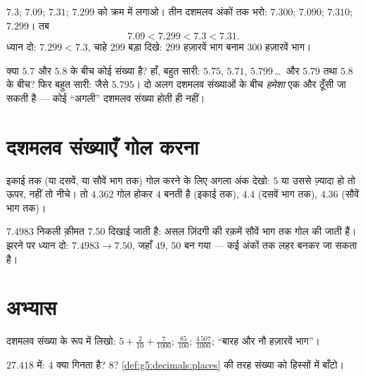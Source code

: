 \begin{example}\label{ex:g5:decimals:order}
$7.3$; $7.09$; $7.31$; $7.299$ को क्रम में लगाओ। तीन दशमलव अंकों
तक भरो: $7.300$; $7.090$; $7.310$; $7.299$। तब
\[
7.09 < 7.299 < 7.3 < 7.31 .
\]
ध्यान दो: $7.299 < 7.3$, चाहे $299$ बड़ा दिखे: $299$ हज़ारवें
भाग बनाम $300$ हज़ारवें भाग।
\end{example}

\begin{example}\label{ex:g5:decimals:between}
क्या $5.7$ और $5.8$ के बीच कोई संख्या है? हाँ, बहुत सारी:
$5.75$, $5.71$, $5.799$\,\dots\ और $5.79$ तथा $5.8$ के बीच? फिर
बहुत सारी: जैसे $5.795$। दो अलग दशमलव संख्याओं के बीच
\emph{हमेशा} एक और ठूँसी जा सकती है --- कोई ``अगली'' दशमलव संख्या
होती ही नहीं।
\end{example}

\section{दशमलव संख्याएँ गोल करना}

\begin{definition}[गोल करना]\label{def:g5:decimals:round}
इकाई तक (या दसवें, या सौवें भाग तक) गोल करने के लिए अगला अंक
देखो: $5$ या उससे ज़्यादा हो तो ऊपर, नहीं तो नीचे। तो $4.362$
गोल होकर $4$ बनती है (इकाई तक), $4.4$ (दसवें भाग तक), $4.36$ (सौवें भाग तक)।
\end{definition}

\begin{example}[पैसा सौवें भाग तक गोल होता है]\label{ex:g5:decimals:money}
$7.4983$ निकली क़ीमत $7.50$ दिखाई जाती है: असल ज़िंदगी की रक़में
सौवें भाग तक गोल की जाती हैं। झरने पर ध्यान दो: $7.4983 \to
7.50$, जहाँ $49$, $50$ बन गया ---  कई अंकों तक लहर बनकर
जा सकता है।
\end{example}

\section{अभ्यास}

\begin{exercise}[$\star$]\label{exo:g5:decimals:1}
दशमलव संख्या के रूप में लिखो: $5 + \frac{2}{10} + \frac{7}{1000}$;
\quad $\frac{85}{100}$; \quad $\frac{4\,507}{1000}$; \quad ``बारह
और नौ हज़ारवें भाग''।
\end{exercise}

\begin{exercise}[$\star$]\label{exo:g5:decimals:2}
$27.418$ में: $4$ क्या गिनता है? $8$?
\cref{def:g5:decimals:places} की तरह संख्या को हिस्सों में बाँटो।
\end{exercise}

